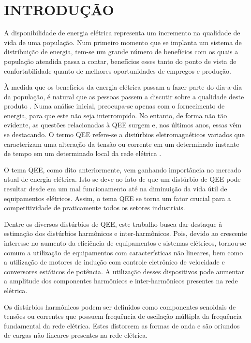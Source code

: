 \documentclass[a4paper,12pt]{monografia}
\theoremstyle{plain}
\theoremstyle{definition}
\theoremstyle{remark}
\begin{document}
\chapter{INTRODUÇÃO}  
\label{ch:introducao}

A disponibilidade de energia elétrica representa um incremento na qualidade de vida de uma população. Num primeiro momento que se implanta um sistema de distribuição de energia, tem-se um grande número de benefícios com os quais a população atendida passa a contar, benefícios esses tanto do ponto de vista de confortabilidade quanto de melhores oportunidades de empregos e produção.

À medida que os benefícios da energia elétrica passam a fazer parte do dia-a-dia da população, é natural que as pessoas passem a discutir sobre a qualidade deste produto \cite{mehl2012qualidade}. Numa análise inicial, preocupa-se apenas com o fornecimento de energia, para que este não seja interrompido. No entanto, de forma não tão evidente, as questões relacionadas à QEE surgem e, nos últimos anos, essas vêm se destacando.
O termo QEE refere-se a distúrbios eletromagnéticos variados que caracterizam uma alteração da tensão ou corrente em um determinado instante de tempo em um determinado local da rede elétrica \cite{limanova}. 

O tema QEE, como dito anteriormente, vem ganhando importância no mercado atual de energia elétrica. Isto se deve ao fato de que um distúrbio de QEE pode resultar desde em um mal funcionamento até na diminuição da vida útil de equipamentos elétricos. Assim, o tema QEE se torna um fator crucial para a competitividade de praticamente todos os setores industriais.

Dentre os diversos distúrbios de QEE, este trabalho busca dar destaque à estimação dos distúrbios harmônicos e inter-harmônicos. Pois, devido ao crescente interesse no aumento da eficiência de equipamentos e sistemas elétricos, tornou-se comum a utilização de equipamentos com  características não lineares, bem como a utilização de motores de indução com controle eletrônico de velocidade e conversores estáticos de potência. A utilização desses dispositivos pode aumentar a amplitude dos componentes harmônicos e inter-harmônicos presentes na rede elétrica.

Os distúrbios harmônicos podem ser definidos como componentes senoidais de tensões ou correntes que possuem frequência de oscilação múltipla da frequência fundamental da rede elétrica. Estes distorcem as formas de onda e são oriundos de cargas não lineares presentes na rede elétrica. 
\end{document}
